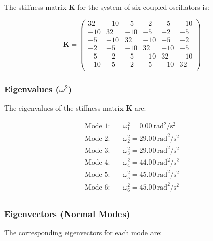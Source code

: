 \documentclass[12pt]{report} %
\begin{document}
The stiffness matrix \( \mathbf{K} \) for the system of six coupled oscillators is:

\[
\mathbf{K} =
\begin{pmatrix}
32 & -10 & -5 & -2 & -5 & -10 \\
-10 & 32 & -10 & -5 & -2 & -5 \\
-5 & -10 & 32 & -10 & -5 & -2 \\
-2 & -5 & -10 & 32 & -10 & -5 \\
-5 & -2 & -5 & -10 & 32 & -10 \\
-10 & -5 & -2 & -5 & -10 & 32 \\
\end{pmatrix}
\]

\subsubsection{Eigenvalues (\( \omega^2 \))}
\label{subsubsec:part2_task2_eigenvalues_result}

The eigenvalues of the stiffness matrix \( \mathbf{K} \) are:

\[
\begin{aligned}
\text{Mode 1}: & \quad \omega_1^2 = 0.00 \, \text{rad}^2/\text{s}^2 \\
\text{Mode 2}: & \quad \omega_2^2 = 29.00 \, \text{rad}^2/\text{s}^2 \\
\text{Mode 3}: & \quad \omega_3^2 = 29.00 \, \text{rad}^2/\text{s}^2 \\
\text{Mode 4}: & \quad \omega_4^2 = 44.00 \, \text{rad}^2/\text{s}^2 \\
\text{Mode 5}: & \quad \omega_5^2 = 45.00 \, \text{rad}^2/\text{s}^2 \\
\text{Mode 6}: & \quad \omega_6^2 = 45.00 \, \text{rad}^2/\text{s}^2 \\
\end{aligned}
\]

\subsubsection{Eigenvectors (Normal Modes)}
\label{subsubsec:part2_task2_eigenvectors_result}

The corresponding eigenvectors for each mode are:
\end{document}
